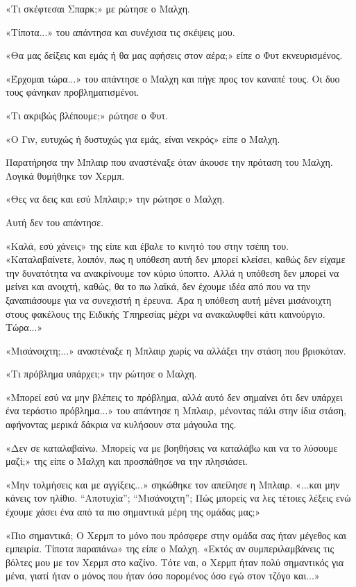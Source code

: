 \documentclass[12pt,twoside, openany]{book}
\begin{document}
«Τι σκέφτεσαι Σπαρκ;» με ρώτησε ο Μαλχη.

«Τίποτα...» του απάντησα και συνέχισα τις σκέψεις μου.

«Θα μας δείξεις και εμάς ή θα μας αφήσεις στον αέρα;» είπε ο Φυτ εκνευρισμένος.

«Έρχομαι τώρα...» του απάντησε ο Μαλχη και πήγε προς τον καναπέ τους. Οι δυο τους φάνηκαν προβληματισμένοι.

«Τι ακριβώς βλέπουμε;» ρώτησε ο Φυτ.

«Ο Γιν, ευτυχώς ή δυστυχώς για εμάς, είναι νεκρός» είπε ο Μαλχη. 

Παρατήρησα την Μπλαιρ που αναστέναξε όταν άκουσε την πρόταση του Μαλχη. Λογικά θυμήθηκε τον Χερμπ.

«Θες να δεις και εσύ Μπλαιρ;» την ρώτησε ο Μαλχη.

Αυτή δεν του απάντησε.

«Καλά, εσύ χάνεις» της είπε και έβαλε το κινητό του στην τσέπη του. «Καταλαβαίνετε, λοιπόν, πως η υπόθεση αυτή δεν μπορεί κλείσει, καθώς δεν είχαμε την δυνατότητα να ανακρίνουμε τον κύριο ύποπτο. Αλλά η υπόθεση δεν μπορεί να μείνει και ανοιχτή, καθώς, θα το πω λαϊκά, δεν έχουμε ιδέα από που να την ξαναπιάσουμε για να συνεχιστή η έρευνα. Άρα η υπόθεση αυτή μένει μισάνοιχτη στους φακέλους της Ειδικής Υπηρεσίας μέχρι να ανακαλυφθεί κάτι καινούργιο. Τώρα...»

«Μισάνοιχτη;...» αναστέναξε η Μπλαιρ χωρίς να αλλάξει την στάση που βρισκόταν.

«Τι πρόβλημα υπάρχει;» την ρώτησε ο Μαλχη.

«Μπορεί εσύ να μην βλέπεις το πρόβλημα, αλλά αυτό δεν σημαίνει ότι δεν υπάρχει ένα τεράστιο πρόβλημα...» του απάντησε η Μπλαιρ, μένοντας πάλι στην ίδια στάση, αφήνοντας μερικά δάκρια να κυλήσουν στα μάγουλα της.

«Δεν σε καταλαβαίνω. Μπορείς να με βοηθήσεις να καταλάβω και να το λύσουμε μαζί;» της είπε ο Μαλχη και προσπάθησε να την πλησιάσει.

«Μην τολμήσεις και με αγγίξεις...» σηκώθηκε τον απείλησε η Μπλαιρ. «...και μην κάνεις τον ηλίθιο. “Αποτυχία”; “Μισάνοιχτη”; Πώς μπορείς να λες τέτοιες λέξεις ενώ έχουμε χάσει ένα από τα πιο σημαντικά μέρη της ομάδας μας;»

«Πιο σημαντικά; Ο Χερμπ το μόνο που πρόσφερε στην ομάδα σας ήταν μέγεθος και εμπειρία. Τίποτα παραπάνω» της είπε ο Μαλχη. «Εκτός αν συμπεριλαμβάνεις τις βόλτες μου με τον Χερμπ στο καζίνο. Τότε ναι, ο Χερμπ ήταν πολύ σημαντικός για μένα, γιατί ήταν ο μόνος που ήταν όσο πορομένος όσο εγώ στον τζόγο και...»
\end{document}
